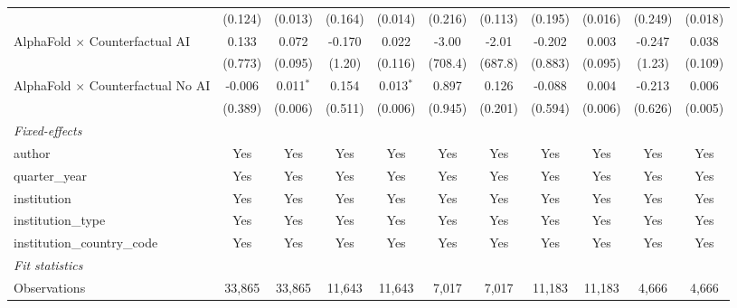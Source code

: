 \begin{tabular}{lcccccccccc}
                                            & (0.124)       & (0.013)        & (0.164)       & (0.014)        & (0.216) & (0.113) & (0.195)       & (0.016)        & (0.249)      & (0.018)\\   
   AlphaFold $\times$ Counterfactual AI     & 0.133         & 0.072          & -0.170        & 0.022          & -3.00   & -2.01   & -0.202        & 0.003          & -0.247       & 0.038\\   
                                            & (0.773)       & (0.095)        & (1.20)        & (0.116)        & (708.4) & (687.8) & (0.883)       & (0.095)        & (1.23)       & (0.109)\\   
   AlphaFold $\times$ Counterfactual No AI  & -0.006        & 0.011$^{*}$    & 0.154         & 0.013$^{*}$    & 0.897   & 0.126   & -0.088        & 0.004          & -0.213       & 0.006\\   
                                            & (0.389)       & (0.006)        & (0.511)       & (0.006)        & (0.945) & (0.201) & (0.594)       & (0.006)        & (0.626)      & (0.005)\\   
   \midrule
   \emph{Fixed-effects}\\
   author                                   & Yes           & Yes            & Yes           & Yes            & Yes     & Yes     & Yes           & Yes            & Yes          & Yes\\  
   quarter\_year                            & Yes           & Yes            & Yes           & Yes            & Yes     & Yes     & Yes           & Yes            & Yes          & Yes\\  
   institution                              & Yes           & Yes            & Yes           & Yes            & Yes     & Yes     & Yes           & Yes            & Yes          & Yes\\  
   institution\_type                        & Yes           & Yes            & Yes           & Yes            & Yes     & Yes     & Yes           & Yes            & Yes          & Yes\\  
   institution\_country\_code               & Yes           & Yes            & Yes           & Yes            & Yes     & Yes     & Yes           & Yes            & Yes          & Yes\\  
   \midrule
   \emph{Fit statistics}\\
   Observations                             & 33,865        & 33,865         & 11,643        & 11,643         & 7,017   & 7,017   & 11,183        & 11,183         & 4,666        & 4,666\\  

\end{tabular}
